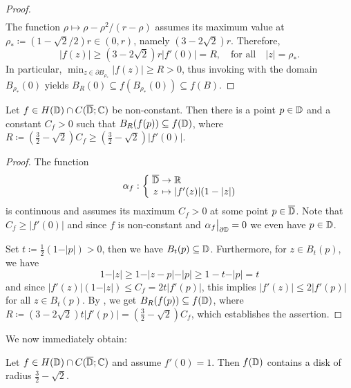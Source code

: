\begin{proof}
\begin{align*}
    \end{align*}
    The function $\rho \mapsto \rho - \rho^2 / (r - \rho)$ assumes its maximum value at $\rho_* \coloneqq (1 - \sqrt{2} / 2)r \in (0, r)$, namely $(3 - 2 \sqrt{2}) r$. Therefore,
    \begin{equation*}
        \vert f(z) \vert \geq (3 - 2 \sqrt{2}) r \vert f'(0) \vert = R, \quad \textrm{for all} \quad \vert z \vert = \rho_*.
    \end{equation*}
    In particular, $\min_{z \in \partial B_{\rho_*}} \vert f(z) \vert \geq R > 0$, thus invoking  with the domain $B_{\rho_*}(0)$ yields $B_{R}(0) \subseteq f(B_{\rho_*}(0)) \subseteq f(B)$.
\end{proof}

\begin{theorem} \label{thm:bloch-stronger}
    Let $f \in H(\mathbb{D}) \cap C(\overline{\mathbb{D}}; \mathbb{C})$ be non-constant. Then there is a point $p \in \mathbb{D}$ and a constant $C_f > 0$ such that $B_{R}(f(p)) \subseteq f(\mathbb{D})$, where $R \coloneqq (\frac{3}{2} - \sqrt{2}) C_f \geq (\frac{3}{2} - \sqrt{2}) \vert f'(0) \vert$.
\end{theorem}

\begin{proof}
    The function
    $$ \mapping{\alpha_f}{\cl{\D} & \to & \R}{z & \mapsto & \vert f'(z) \vert (1 - \vert z \vert)} $$
    is continuous and assumes its maximum $C_f > 0$ at some point $p \in \overline{\mathbb{D}}$. Note that $C_f \geq \vert f'(0) \vert$ and since $f$ is non-constant and $\restr{\alpha_f}{\partial \D} = 0$ we even have $p \in \mathbb{D}$.

    Set $t \coloneqq \frac{1}{2}(1 - \vert p \vert) > 0$, then we have $B_{t}(p) \subseteq \mathbb{D}$. Furthermore, for $z \in B_t(p)$, we have
    $$ 1 - \vert z \vert \geq 1 - \vert z - p \vert - \vert p \vert \geq 1 - t - \vert p \vert = t $$
    and since $\vert f'(z) \vert (1 - \vert z \vert) \leq C_f = 2 t \vert f'(p) \vert$, this implies $\vert f'(z) \vert \leq 2 \vert f'(p) \vert$ for all $z \in B_t(p)$. By , we get $ B_{R}(f(p)) \subseteq f(\mathbb{D}) $, where $R \coloneqq (3 - 2 \sqrt{2}) t \vert f'(p) \vert = ({\textstyle \frac{3}{2}} - \sqrt{2}) C_f$,
    which establishes the assertion.
\end{proof}

We now immediately obtain:    

\begin{theorem}[Bloch] \label{thm:bloch}
    Let $f \in H(\mathbb{D}) \cap C(\overline{\mathbb{D}}; \mathbb{C})$ and assume $f'(0) = 1$. Then $f(\mathbb{D})$ contains a disk of radius $\frac{3}{2} - \sqrt{2}$.
\end{theorem}

